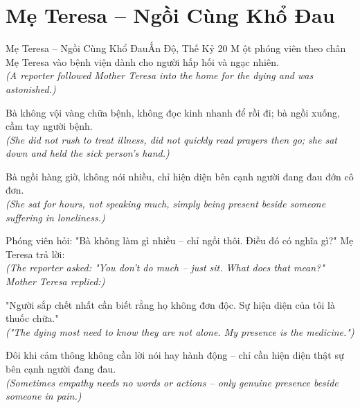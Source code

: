 \section{Mẹ Teresa -- Ngồi Cùng Khổ Đau}
\begin{truyen}{Mẹ Teresa -- Ngồi Cùng Khổ Đau}{Ấn Độ, Thế Kỷ 20}
M ột phóng viên theo chân Mẹ Teresa vào bệnh viện dành cho người hấp hối và ngạc nhiên.\\
\textit{(A reporter followed Mother Teresa into the home for the dying and was astonished.)}

Bà không vội vàng chữa bệnh, không đọc kinh nhanh để rồi đi; bà ngồi xuống, cầm tay người bệnh.\\
\textit{(She did not rush to treat illness, did not quickly read prayers then go; she sat down and held the sick person's hand.)}

Bà ngồi hàng giờ, không nói nhiều, chỉ hiện diện bên cạnh người đang đau đớn cô đơn.\\
\textit{(She sat for hours, not speaking much, simply being present beside someone suffering in loneliness.)}

Phóng viên hỏi: "Bà không làm gì nhiều -- chỉ ngồi thôi. Điều đó có nghĩa gì?" Mẹ Teresa trả lời:\\
\textit{(The reporter asked: "You don't do much -- just sit. What does that mean?" Mother Teresa replied:)}

"Người sắp chết nhất cần biết rằng họ không đơn độc. Sự hiện diện của tôi là thuốc chữa."\\
\textit{("The dying most need to know they are not alone. My presence is the medicine.")}

\end{truyen}
\begin{baihoc}
  Đôi khi cảm thông không cần lời nói hay hành động -- chỉ cần hiện diện thật sự bên cạnh người đang đau.\\
  \textit{(Sometimes empathy needs no words or actions -- only genuine presence beside someone in pain.)}
\end{baihoc}

